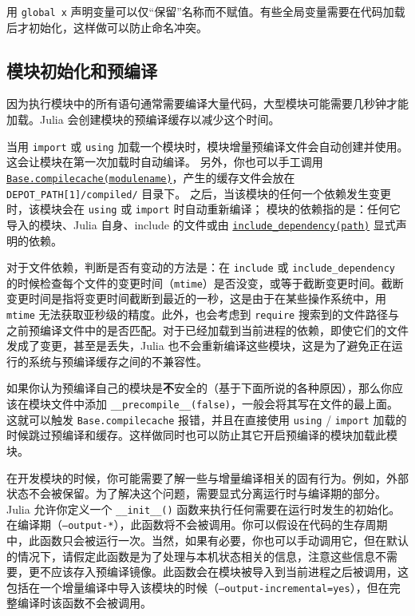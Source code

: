 用 \texttt{global x} 声明变量可以仅“保留”名称而不赋值。有些全局变量需要在代码加载后才初始化，这样做可以防止命名冲突。



\hypertarget{10308651053456408379}{}


\subsection{模块初始化和预编译}



因为执行模块中的所有语句通常需要编译大量代码，大型模块可能需要几秒钟才能加载。Julia 会创建模块的预编译缓存以减少这个时间。



当用 \texttt{import} 或 \texttt{using} 加载一个模块时，模块增量预编译文件会自动创建并使用。这会让模块在第一次加载时自动编译。 另外，你也可以手工调用 \hyperlink{15403934372637978246}{\texttt{Base.compilecache(modulename)}}，产生的缓存文件会放在 \texttt{DEPOT\_PATH[1]/compiled/} 目录下。 之后，当该模块的任何一个依赖发生变更时，该模块会在 \texttt{using} 或 \texttt{import} 时自动重新编译； 模块的依赖指的是：任何它导入的模块、Julia 自身、include 的文件或由 \hyperlink{13423629850785876688}{\texttt{include\_dependency(path)}} 显式声明的依赖。



对于文件依赖，判断是否有变动的方法是：在 \texttt{include} 或 \texttt{include\_dependency} 的时候检查每个文件的变更时间（\texttt{mtime}）是否没变，或等于截断变更时间。截断变更时间是指将变更时间截断到最近的一秒，这是由于在某些操作系统中，用 \texttt{mtime} 无法获取亚秒级的精度。此外，也会考虑到 \texttt{require} 搜索到的文件路径与之前预编译文件中的是否匹配。对于已经加载到当前进程的依赖，即使它们的文件发成了变更，甚至是丢失，Julia 也不会重新编译这些模块，这是为了避免正在运行的系统与预编译缓存之间的不兼容性。



如果你认为预编译自己的模块是\textbf{不}安全的（基于下面所说的各种原因），那么你应该在模块文件中添加 \texttt{\_\_precompile\_\_(false)}，一般会将其写在文件的最上面。这就可以触发 \texttt{Base.compilecache} 报错，并且在直接使用 \texttt{using} / \texttt{import} 加载的时候跳过预编译和缓存。这样做同时也可以防止其它开启预编译的模块加载此模块。



在开发模块的时候，你可能需要了解一些与增量编译相关的固有行为。例如，外部状态不会被保留。为了解决这个问题，需要显式分离运行时与编译期的部分。Julia 允许你定义一个 \texttt{\_\_init\_\_()} 函数来执行任何需要在运行时发生的初始化。在编译期（\texttt{--output-*}），此函数将不会被调用。你可以假设在代码的生存周期中，此函数只会被运行一次。当然，如果有必要，你也可以手动调用它，但在默认的情况下，请假定此函数是为了处理与本机状态相关的信息，注意这些信息不需要，更不应该存入预编译镜像。此函数会在模块被导入到当前进程之后被调用，这包括在一个增量编译中导入该模块的时候（\texttt{--output-incremental=yes}），但在完整编译时该函数不会被调用。



